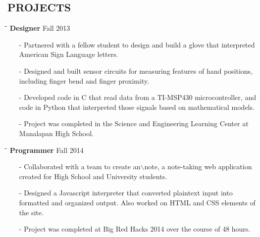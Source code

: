 \documentclass{res}
\begin{document}
\begin{resume}
    
\section{PROJECTS}    
	\vspace{-5pt}
	\begin{tabbing}
    \hspace{2.3in}\= \hspace{2.4in}\= \kill
    {\bf Designer}  \>Fall 2013\\
  \end{tabbing}\vspace{-15pt}
  \begin{itemize}[leftmargin=*, nolistsep]
    \item[-] Partnered with a fellow student to design and build a glove that interpreted American Sign Language letters.
    \item[-] Designed and built sensor circuits for measuring features of hand positions, including finger bend and finger proximity.
    \item[-] Developed code in C that read data from a TI-MSP430 microcontroller, and code in Python that interpreted those signals based on mathematical models.
    \item[-] Project was completed in the Science and Engineering Learning Center at Manalapan High School.
  \end{itemize}
  \vspace{-10pt}
  \begin{tabbing}
    \hspace{2.3in}\= \hspace{2.4in}\= \kill
    {\bf Programmer}  \>Fall 2014\\
  \end{tabbing}\vspace{-15pt}
  \begin{itemize}[leftmargin=*, nolistsep]
    \item[-] Collaborated with a team to create an$\backslash$note, a note-taking web application created for High School and University students.
    \item[-] Designed a Javascript interpreter that converted plaintext input into formatted and organized output. Also worked on HTML and CSS elements of the site.
    \item[-] Project was completed at Big Red Hacks 2014 over the course of 48 hours.
  \end{itemize}
  \vspace{-10pt}

\end{resume}
\end{document}
